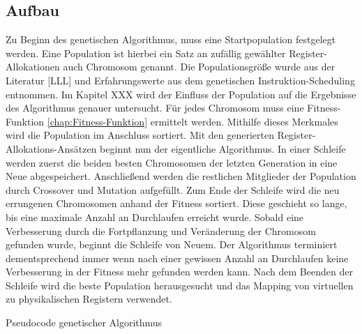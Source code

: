 \subsection{Aufbau}
\label{chap:aufbau}
Zu Beginn des genetischen Algorithmus, muss eine Startpopulation festgelegt werden. Eine Population ist hierbei ein Satz an zufällig gewählter Register-Allokationen auch Chromosom genannt. Die Populationsgröße wurde aus der Literatur [LLL] und Erfahrungswerte aus dem genetischen Instruktion-Scheduling entnommen. Im Kapitel XXX wird der Einfluss der Population auf die Ergebnisse  des Algorithmus genauer untersucht.
Für jedes Chromosom muss eine Fitness-Funktion \ref{chap:Fitness-Funktion} ermittelt werden. Mithilfe dieses Merkmales wird die Population im Anschluss sortiert. 
Mit den generierten Register-Allokations-Ansätzen beginnt nun der eigentliche Algorithmus. In einer Schleife werden zuerst die beiden besten Chromosomen der letzten Generation in eine Neue abgespeichert. Anschließend werden die restlichen Mitglieder der Population durch Crossover und Mutation aufgefüllt. Zum Ende der Schleife wird die neu errungenen Chromosomen anhand der Fitness sortiert. Diese geschieht so lange, bis eine maximale Anzahl an Durchlaufen erreicht wurde. Sobald eine Verbesserung durch die Fortpflanzung und Veränderung der Chromosom gefunden wurde, beginnt die Schleife von Neuem. Der Algorithmus terminiert dementsprechend immer wenn nach einer gewissen Anzahl an Durchlaufen keine Verbesserung in der Fitness mehr gefunden werden kann. Nach dem Beenden der Schleife wird die beste Population herausgesucht und das Mapping von virtuellen zu physikalischen Registern verwendet.

\begin{algorithm}[H]
	\begin{algorithmic}[1]
%		
		 
		\ENDFOR
		\ENDIF
	\ENDWHILE
	\caption{Pseudocode genetischer Algorithmus}
\end{algorithmic}
\end{algorithm}

